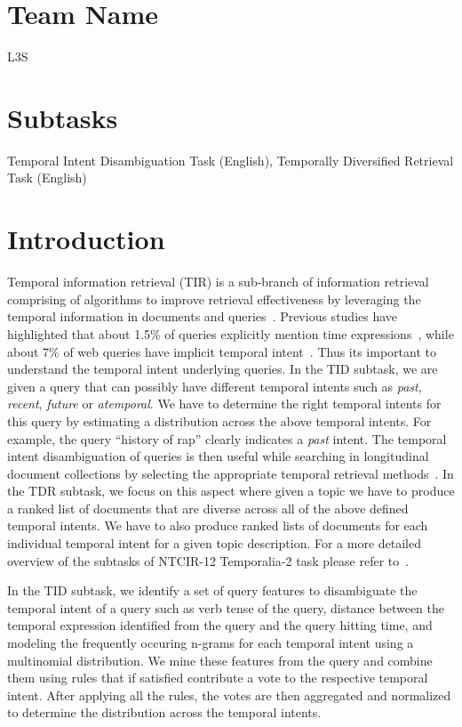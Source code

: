 \documentclass{sig-alternate}
\begin{document}
\section*{Team Name}
L3S

\section*{Subtasks}
Temporal Intent Disambiguation Task (English), Temporally Diversified Retrieval Task (English)


\section{Introduction}

Temporal information retrieval (TIR) is a sub-branch of information retrieval comprising of algorithms to improve retrieval effectiveness by leveraging the temporal information in documents and queries~\cite{tir,twaw,tir15}. Previous studies have highlighted that about 1.5\% of queries explicitly mention time expressions~\cite{ecir08}, while about 7\% of web queries have implicit temporal intent~\cite{sigir09}. Thus its important to understand the temporal intent underlying queries. In the \textsf{TID subtask}, we are given a query that can possibly have different temporal intents such as \textit{past}, \textit{recent}, \textit{future} or \textit{atemporal}. We have to determine the right temporal intents for this query by estimating a distribution across the above temporal intents. For example, the query ``history of rap'' clearly indicates a \textit{past} intent. The temporal intent disambiguation of queries is then useful while searching in longitudinal document collections by selecting the appropriate temporal retrieval methods~\cite{ecir10,ecdl10,cikm03}. In the \textsf{TDR subtask}, we focus on this aspect where given a topic we have to produce a ranked list of documents that are diverse across all of the above defined temporal intents. We have to also produce ranked lists of documents for each individual temporal intent for a given topic description. For a more detailed overview of the subtasks of NTCIR-12 Temporalia-2 task please refer to~\cite{mioverview}.

In the TID subtask, we identify a set of query features to disambiguate the temporal intent of a query such as verb tense of the query, distance between the temporal expression identified from the query and the query hitting time, and modeling the frequently occuring n-grams for each temporal intent using a multinomial distribution. %
 We mine these features from the query and combine them using rules that if satisfied contribute a vote to the respective temporal intent. After applying all the rules, the votes are then aggregated and normalized to determine the distribution across the temporal intents.
\end{document}

